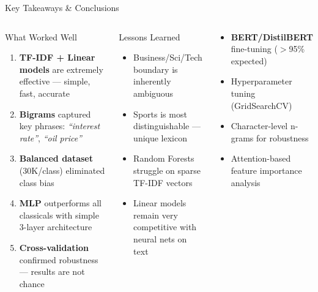 \documentclass[aspectratio=169,11pt]{beamer}
\begin{document}
\begin{frame}{Key Takeaways \& Conclusions}
\begin{columns}[T]
    \begin{block}{What Worked Well}
      \small
      \begin{enumerate}
        \item \textbf{TF-IDF + Linear models} are extremely effective --- simple, fast, accurate
        \item \textbf{Bigrams} captured key phrases: \textit{``interest rate''}, \textit{``oil price''}
        \item \textbf{Balanced dataset} (30K/class) eliminated class bias
        \item \textbf{MLP} outperforms all classicals with simple 3-layer architecture
        \item \textbf{Cross-validation} confirmed robustness --- results are not chance
      \end{enumerate}
    \end{block}
    \begin{block}{Lessons Learned}
      \small
      \begin{itemize}
        \item Business/Sci/Tech boundary is inherently ambiguous
        \item Sports is most distinguishable --- unique lexicon
        \item Random Forests struggle on sparse TF-IDF vectors
        \item Linear models remain very competitive with neural nets on text
      \end{itemize}
    \end{block}
    \vspace{4pt}
    \begin{tcolorbox}[colback=accent!8,colframe=accent,title=Future Directions,fonttitle=\footnotesize\bfseries]
      \footnotesize
      \begin{itemize}
        \item \textbf{BERT/DistilBERT} fine-tuning ($>$95\% expected)
        \item Hyperparameter tuning (GridSearchCV)
        \item Character-level n-grams for robustness
        \item Attention-based feature importance analysis
      \end{itemize}
    \end{tcolorbox}
\end{columns}
\end{frame}
\end{document}
